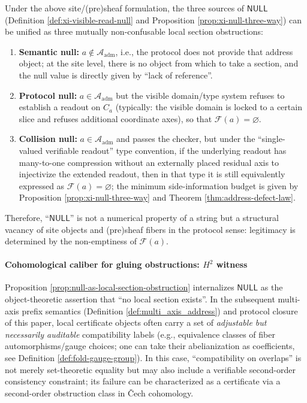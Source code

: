 \begin{corollary}\label{cor:null-trichotomy-local-section}
Under the above site/(pre)sheaf formulation, the three sources of \(\mathsf{NULL}\) (Definition \ref{def:xi-visible-read-null} and Proposition \ref{prop:xi-null-three-way}) can be unified as three mutually non-confusable local section obstructions:
\begin{enumerate}
  \item \textbf{Semantic null:} \(a\notin\mathcal{A}_{\mathrm{adm}}\), i.e., the protocol does not provide that address object; at the site level, there is no object from which to take a section, and the null value is directly given by ``lack of reference''.
  \item \textbf{Protocol null:} \(a\in\mathcal{A}_{\mathrm{adm}}\) but the visible domain/type system refuses to establish a readout on \(C_a\) (typically: the visible domain is locked to a certain slice and refuses additional coordinate axes), so that \(\mathscr{F}(a)=\varnothing\).
  \item \textbf{Collision null:} \(a\in\mathcal{A}_{\mathrm{adm}}\) and passes the checker, but under the ``single-valued verifiable readout'' type convention, if the underlying readout has many-to-one compression without an externally placed residual axis to injectivize the extended readout, then in that type it is still equivalently expressed as \(\mathscr{F}(a)=\varnothing\); the minimum side-information budget is given by Proposition \ref{prop:xi-null-three-way} and Theorem \ref{thm:address-defect-law}.
\end{enumerate}
Therefore, ``\(\mathsf{NULL}\)'' is not a numerical property of a string but a structural vacancy of site objects and (pre)sheaf fibers in the protocol sense: legitimacy is determined by the non-emptiness of \(\mathscr{F}(a)\).
\end{corollary}

\paragraph{Cohomological caliber for gluing obstructions: \texorpdfstring{$H^2$}{H2} witness}
Proposition \ref{prop:null-as-local-section-obstruction} internalizes \(\mathsf{NULL}\) as the object-theoretic assertion that ``no local section exists''.
In the subsequent multi-axis prefix semantics (Definition \ref{def:multi_axis_address}) and protocol closure of this paper, local certificate objects often carry a set of \emph{adjustable but necessarily auditable} compatibility labels (e.g., equivalence classes of fiber automorphisms/gauge choices; one can take their abelianization as coefficients, see Definition \ref{def:fold-gauge-group}).
In this case, ``compatibility on overlaps'' is not merely set-theoretic equality but may also include a verifiable second-order consistency constraint; its failure can be characterized as a certificate via a second-order obstruction class in \v{C}ech cohomology.

